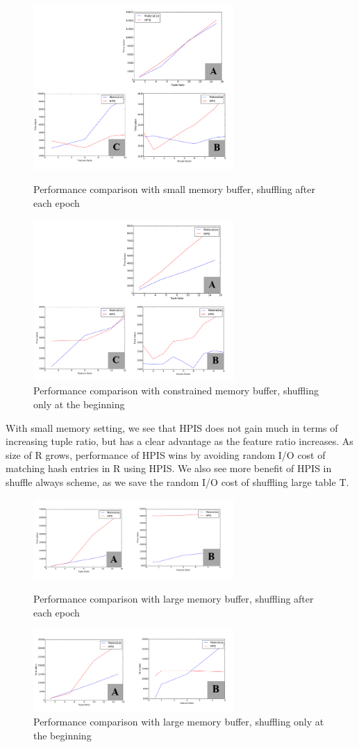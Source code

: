 \documentclass{vldb}
\begin{document}
\begin{figure}[h]
\centering
\includegraphics[width=3.0in]{salways_small}
\caption{Performance comparison with small memory buffer, shuffling after each epoch}
\includegraphics[width=3.0in]{sonce_small}
\caption{Performance comparison with constrained memory buffer, shuffling only at the beginning}

\end{figure}

With small memory setting, we see that HPIS does not gain much in terms of increasing tuple ratio, but has a clear advantage as the feature ratio increases. As size of R grows, performance of HPIS wins by avoiding random I/O cost of matching hash entries in R using HPIS. We also see more benefit of HPIS in shuffle always scheme, as we save the random I/O cost of shuffling large table T.

\begin{figure}[h]
\centering
\includegraphics[width=3.0in]{salways_large}
\caption{Performance comparison with large memory buffer, shuffling after each epoch}
\includegraphics[width=3.0in]{sonce_large}
\caption{Performance comparison with large memory buffer, shuffling only at the beginning}
\end{figure}
\end{document}
